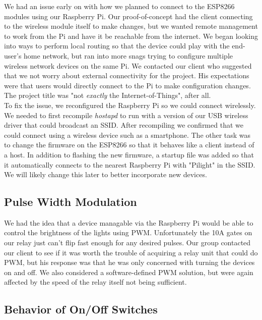 \documentclass[oneside,openright]{book}
\begin{document}
We had an issue early on with how we planned to connect to the ESP8266 modules
using our Raspberry Pi. Our proof-of-concept had the client connecting to the
wireless module itself to make changes, but we wanted remote management to work
from the Pi and have it be reachable from the internet. We began looking into
ways to perform local routing so that the device could play with the end-user's
home network, but ran into more snags trying to configure multiple wireless
network devices on the same Pi. We contacted our client who suggested that we
not worry about external connectivity for the project. His expectations were
that users would directly connect to the Pi to make configuration changes. The
project title was "not \textit{exactly} the Internet-of-Things", after all.\\

To fix the issue, we reconfigured the Raspberry Pi so we could connect
wirelessly. We needed to first recompile \textit{hostapd} to run with a version
of our USB wireless driver that could broadcast an SSID. After recompiling we
confirmed that we could connect using a wireless device such as a smartphone.
The other task was to change the firmware on the ESP8266 so that it behaves
like a client instead of a host. In addition to flashing the new firmware, a
startup file was added so that it automatically connects to the nearest
Raspberry Pi with "Pilight" in the SSID. We will likely change this later to
better incorporate new devices.

\subsection{Pulse Width Modulation}

We had the idea that a device managable via the Raspberry Pi would be able to
control the brightness of the lights using PWM. Unfortunately the 10A gates on
our relay just can't flip fast enough for any desired pulses. Our group
contacted our client to see if it was worth the trouble of acquiring a relay
unit that could do PWM, but his response was that he was only concerned with
turning the devices on and off. We also considered a software-defined PWM
solution, but were again affected by the speed of the relay itself not being
sufficient.

\subsection{Behavior of On/Off Switches}
\end{document}

